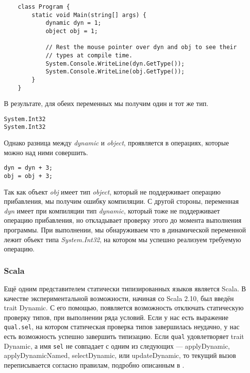 \begin{verbatim}
    class Program {
        static void Main(string[] args) {
            dynamic dyn = 1;
            object obj = 1;

            // Rest the mouse pointer over dyn and obj to see their
            // types at compile time.
            System.Console.WriteLine(dyn.GetType());
            System.Console.WriteLine(obj.GetType());
        }
    }
\end{verbatim}

В результате, для обеих переменных мы получим один и тот же тип.

\begin{verbatim}
System.Int32
System.Int32
\end{verbatim}
    Однако разница между \textit{dynamic} и \textit{object}, проявляется в операциях, которые можно над ними совершить.

\begin{verbatim}
dyn = dyn + 3;  
obj = obj + 3;  
\end{verbatim}

Так как объект \textit{obj} имеет тип \textit{object}, который не поддерживает операцию прибавления, мы получим ошибку компиляции. С другой стороны, переменная \textit{dyn} имеет при компиляции тип \textit{dynamic}, который тоже не поддерживает операцию прибавления, но откладывает проверку этого до момента выполнения программы. При выполнении, мы обнаруживаем что в динамической переменной лежит объект типа \textit{System.Int32}, на котором мы успешно реализуем требуемую операцию.

\subsubsection{Scala}

Ещё одним представителем статически типизированных языков является Scala. В качестве экспериментальной возможности, начиная со Scala 2.10, был введён trait Dynamic. С его помощью, появляется возможность отключать статическую проверку типов, при выполнении ряда условий. Если у нас есть выражение \texttt{qual.sel}, на котором статическая проверка типов завершилась неудачно, у нас есть возможность успешно завершить типизацию. Если \texttt{qual} удовлетворяет trait Dynamic, а имя \texttt{sel} не совпадает с одним из следующих --- applyDynamic, applyDynamicNamed, selectDynamic, или updateDynamic, то текущий вызов переписывается согласно правилам, подробно описанным в \cite{scala:sipDynamicProposal}.

